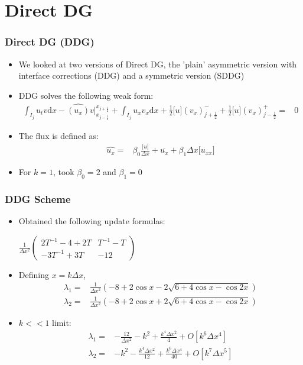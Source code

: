 \documentclass[serif,12pt]{beamer}
\begin{document}
\section{Direct DG}
\begin{frame}
\frametitle{Direct DG (DDG)}
\begin{itemize}
	\item We looked at two versions of Direct DG, the 'plain' asymmetric version with interface corrections (DDG) and a symmetric version (SDDG)
	\item DDG solves the following weak form:
	\begin{align*}
		\int_{I_j} u_t v \mathrm{d}x -\widehat{(u_x)}v\bigr|_{x_{j-\frac{1}{2}}}^{x_{j+\frac{1}{2}}}+\int_{I_j} u_x v_x \mathrm{d}x+ \frac{1}{2}\lbrack u\rbrack(v_x)_{j+\frac{1}{2}}^- + \frac{1}{2}\lbrack u\rbrack(v_x)_{j-\frac{1}{2}}^+= & 0
	\end{align*}
	\item The flux is defined as:
	\begin{align*}
		\widehat{u_x} = & \beta_0 \frac{\lbrack u \rbrack}{\Delta x} + \overline{u_x} + \beta_1 \Delta x \lbrack u_{xx} \rbrack
	\end{align*}
	\item For $k=1$, took $\beta_0 = 2$ and $\beta_1 = 0$
\end{itemize}
\end{frame}

\begin{frame}
\frametitle{DDG Scheme}
\begin{itemize}
	\item Obtained the following update formulas:\\
	\begin{center}
		$\frac{1}{\Delta x^2}\left(
		\begin{array}{cc}
		2T^{-1} -4+2 T & T^{-1}- T \\
		 -3 T^{-1} +3 T & -12
		\end{array}
		\right)$
	\end{center}
	\item Defining $x = k\Delta x$,
		\begin{align*}
			\lambda_1 = & \frac{1}{\Delta x^2}\left(-8 + 2 \cos x - 2 \sqrt{6 + 4 \cos x - \cos 2x}\right)\\
			\lambda_2 = & \frac{1}{\Delta x^2}\left(-8 + 2 \cos x + 2 \sqrt{6 + 4 \cos x - \cos 2x}\right)
		\end{align*}
		\item $k << 1$ limit:
		\begin{align*}
			\lambda_1 = & -\frac{12}{\Delta x^2} - k^2 + \frac{k^4\Delta x^2}{4} + O[k^6\Delta x^4]\\
			\lambda_2 = & -k^2 - \frac{k^4\Delta x^2}{12} + \frac{k^6 \Delta x^4}{40} + O[k^7\Delta x^5]
		\end{align*}
\end{itemize}
\end{frame}
\end{document}
